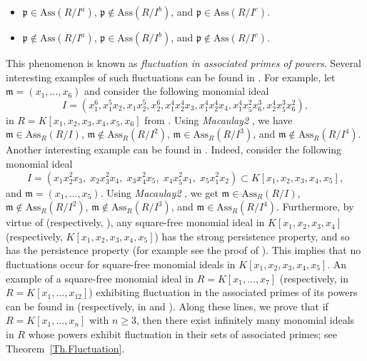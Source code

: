 \documentclass[11pt]{amsart}
\begin{document}
\begin{itemize}
    \item[(i)] $\mathfrak{p} \in \mathrm{Ass}(R/I^a)$,
    $\mathfrak{p} \notin \mathrm{Ass}(R/I^b)$, and
    $\mathfrak{p} \in \mathrm{Ass}(R/I^c)$.

    \item[(ii)] $\mathfrak{p} \notin \mathrm{Ass}(R/I^a)$,
    $\mathfrak{p} \in \mathrm{Ass}(R/I^b)$, and
    $\mathfrak{p} \notin \mathrm{Ass}(R/I^c)$.
\end{itemize}
This phenomenon is known as \textit{fluctuation in  associated primes of powers}. Several interesting examples of such fluctuations can be
found in \cite{BHH,HH2,RS}.
For example, let $\mathfrak{m}=(x_1, \ldots, x_6)$ and consider the following monomial ideal 
  $$I=(x_1^6, x_1^5x_2, x_1x_2^5, x_2^6, x_1^4x_2^4x_3, x_1^4x_2^4x_4, x_1^4x_5^2x_6^3, x_2^4x_5^3x_6^2),$$ 
 in $R=K[x_1, x_2, x_3, x_4, x_5, x_6]$ from \cite[p.~549]{HH2}. 
  Using  \textit{Macaulay2} \cite{GS}, we have  $\mathfrak{m}\in \mathrm{Ass}_R(R/I)$, $\mathfrak{m}\notin \mathrm{Ass}_R(R/I^2)$,  
 $\mathfrak{m}\in \mathrm{Ass}_R(R/I^3)$, and  $\mathfrak{m}\notin \mathrm{Ass}_R(R/I^4)$.  
 Another interesting example can be found in \cite[Exercise 7.7.25]{V1}. Indeed, consider  the following monomial ideal 
$$I=(x_1x_2^2x_3,\; x_2x_3^2x_4,\; x_3x_4^2x_5,\; x_4x_5^2x_1,\; x_5x_1^2x_2) \subset K[x_1, x_2, x_3, x_4, x_5],$$
 and  $\mathfrak{m} = (x_1, \dots, x_5)$.  Using  \textit{Macaulay2} \cite{GS}, we get  $\mathfrak{m}\in \mathrm{Ass}_R(R/I)$, $\mathfrak{m}\notin \mathrm{Ass}_R(R/I^2)$,   $\mathfrak{m}\notin \mathrm{Ass}_R(R/I^3)$, and  $\mathfrak{m}\in \mathrm{Ass}_R(R/I^4)$.
Furthermore, by virtue of    \cite[Theorem 9]{RT} (respectively, \cite[Theorem 3.18]{BNT}), any square-free monomial ideal in 
 $K[x_1,x_2,x_3,x_4]$ (respectively, $K[x_1,x_2,x_3,x_4,x_5]$) has the strong persistence property, and so has the persistence property (for example see  the proof of \cite[Proposition 2.9]{N1}). This implies that no fluctuations occur for  square-free monomial ideals in $K[x_1,x_2,x_3,x_4,x_5]$. 
 An example of a square-free monomial ideal in $R=K[x_1,\ldots,x_7]$ (respectively, in $R=K[x_1,\ldots,x_{12}]$) exhibiting fluctuation in
the associated primes of its powers can be found in \cite[Example 2.9]{MS} (respectively, in  \cite{Kaiser2014} and \cite[p.~3788]{ANR2}).
 Along these lines, we prove that if $R=K[x_1,\ldots,x_n]$ with $n\geq 3$, then there exist infinitely many monomial ideals in $R$
whose powers exhibit fluctuation in their sets of associated primes; see Theorem~\ref{Th.Fluctuation}.
\end{document}

